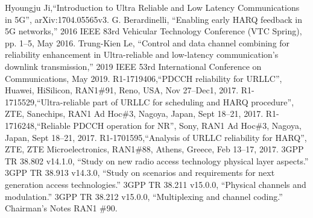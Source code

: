 \documentclass[conference]{IEEEtran}
\begin{document}
\begin{thebibliography}{00}
 Hyoungju Ji,``Introduction to Ultra Reliable and Low Latency Communications in 5G'', arXiv:1704.05565v3.
 G. Berardinelli, ``Enabling early HARQ feedback in 5G networks,'' 2016 IEEE 83rd Vehicular Technology Conference (VTC Spring), pp. 1–5, May 2016.
 Trung-Kien Le, ``Control and data channel combining for reliability enhancement in Ultra-reliable and low-latency communication's downlink transmission,'' 2019 IEEE 53rd International Conference on Communications, May 2019.
 R1-1719406,``PDCCH reliability for URLLC'', Huawei, HiSilicon, RAN1\#91, Reno, USA, Nov 27--Dec1, 2017.
 R1-1715529,``Ultra-reliable part of URLLC for scheduling and HARQ procedure'', ZTE, Sanechips, RAN1 Ad Hoc\#3, Nagoya, Japan, Sept 18--21, 2017.
 R1-1716248,``Reliable PDCCH operation for NR'', Sony, RAN1 Ad Hoc\#3, Nagoya, Japan, Sept 18--21, 2017.
 R1-1701595,``Analysis of URLLC reliability for HARQ'', ZTE, ZTE Microelectronics, RAN1\#88, Athens, Greece, Feb 13--17, 2017.
 3GPP TR 38.802 v14.1.0, ``Study on new radio access technology physical layer aspects.''
 3GPP TR 38.913 v14.3.0, ``Study on scenarios and requirements for next generation access technologies.''
 3GPP TR 38.211 v15.0.0, ``Physical channels and modulation.''
 3GPP TR 38.212 v15.0.0, ``Multiplexing and channel coding.''
 Chairman's Notes RAN1 \#90.

\end{thebibliography}
\vspace{12pt}
\end{document}
